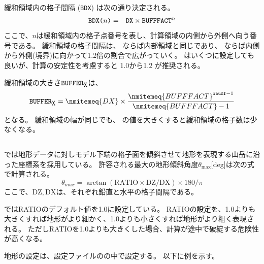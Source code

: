 緩和領域内の格子間隔 (\verb|BDX|) は次の通り決定される。
\begin{eqnarray}
 \verb|BDX(|n\verb|)| &=& \verb|DX| \times \verb|BUFFFACT|^n \nonumber
\end{eqnarray}
ここで、$n$は緩和領域内の格子点番号を表し、計算領域の内側から外側へ向う番号である。
緩和領域の格子間隔は、
ならば内部領域と同じであり、
ならば内側から外側(境界)に向かって1.2倍の割合で広がっていく。
はいくつに設定しても良いが、計算の安定性を考慮すると 1.0から1.2 が推奨される。


緩和領域の大きさ$\verb|BUFFER|_{\verb|X|}$は、
\[
  \verb|BUFFER|_{\verb|X|} = \nmitemeq{DX} \times \frac{ \nmitemeq{BUFFFACT}^{\texttt{\detokenize{ibuff}}-1 }}{ \nmitemeq{BUFFFACT}-1 }
\]
となる。
%
緩和領域の幅が同じでも、
の値を大きくすると緩和領域の格子数は少なくなる。




\subsection{\SecBasicTopoSetting} \label{subsec:basic_usel_topo}

\scalerm では地形データに対しモデル下端の格子面を傾斜させて地形を表現する山岳に沿った座標系を採用している。
許容される最大の地形傾斜角度$\theta_{\max}$[deg]は次の式で計算される。
\[ \theta_{max} = \arctan( \mathrm{RATIO} \times \mathrm{DZ} / \mathrm{DX} ) \times 180/\pi \]
ここで、$\mathrm{DZ}, \mathrm{DX}$は、それぞれ鉛直と水平の格子間隔である。

\scalerm ではRATIOのデフォルト値を1.0に設定している。
RATIOの設定を、1.0よりも大きくすれば地形がより細かく、1.0よりも小さくすれば地形がより粗く表現される。
ただしRATIOを1.0よりも大きくした場合、計算が途中で破綻する危険性が高くなる。

地形の設定は、設定ファイルのの中で設定する。
以下に例を示す。\\

\\


